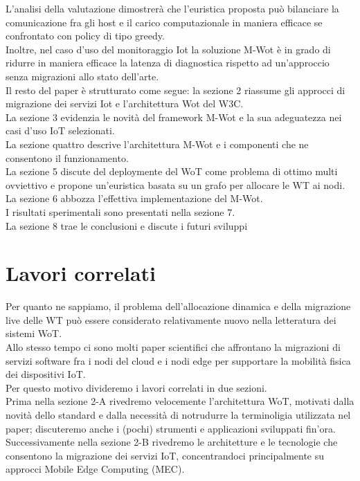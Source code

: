 \documentclass[11pt]{article}
\begin{document}
  	L'analisi della valutazione dimostrerà che l'euristica proposta può bilanciare la comunicazione fra gli host e il carico computazionale in maniera efficace se confrontato con policy di tipo greedy. \\
  	Inoltre, nel caso d'uso del monitoraggio Iot la soluzione M-Wot è in grado di ridurre in maniera efficace la latenza di diagnostica rispetto ad un'approccio senza migrazioni allo stato dell'arte.\\
  	Il resto del paper è strutturato come segue: la sezione 2 riassume gli approcci di migrazione dei servizi Iot e l'architettura Wot del W3C. \\
  	La sezione 3 evidenzia le novità del framework M-Wot e la sua adeguatezza nei casi d'uso IoT selezionati. \\
  	La sezione quattro descrive l'architettura M-Wot e i componenti che ne consentono il funzionamento. \\
  	La sezione 5 discute del deploymente del WoT come problema di ottimo multi ovviettivo e propone un'euristica basata su un grafo per allocare le WT ai nodi. \\
  	La sezione 6 abbozza l'effettiva implementazione del M-Wot. \\
  	I risultati sperimentali sono presentati nella sezione 7. \\
  	La sezione 8 trae le conclusioni e discute i futuri sviluppi


 	\section{Lavori correlati}
 	Per quanto ne sappiamo, il problema dell'allocazione dinamica e della migrazione live delle WT può essere considerato relativamente nuovo nella letteratura dei sistemi WoT. \\
 	Allo stesso tempo ci sono molti paper scientifici che affrontano la migrazioni di servizi software fra i nodi del cloud e i nodi edge per supportare la mobilità fisica dei dispositivi IoT. \\
 	Per questo motivo divideremo i lavori correlati in due sezioni.\\
 	Prima nella sezione 2-A rivedremo velocemente l'architettura WoT, motivati dalla novità dello standard e dalla necessità di notrudurre la terminoligia utilizzata nel paper; discuteremo anche i (pochi) strumenti e applicazioni sviluppati fin'ora. \\
 	Successivamente nella sezione 2-B rivedremo le architetture e le tecnologie che consentono la migrazione dei servizi IoT, concentrandoci principalmente su approcci Mobile Edge Computing (MEC).
 	
\end{document}
